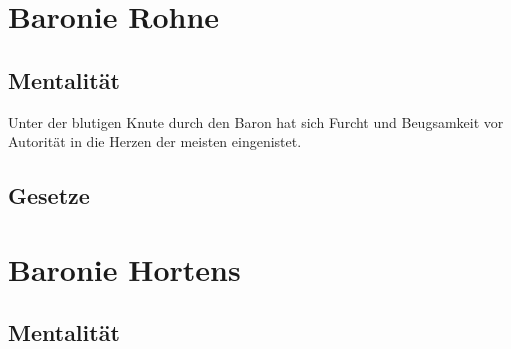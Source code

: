\documentclass[a4paper,12pt,oneside]{book}
\begin{document}
\section{Baronie Rohne}
\subsection{Mentalität}
Unter der blutigen Knute durch den Baron hat sich Furcht und Beugsamkeit vor Autorität in die Herzen der meisten eingenistet.  
\subsection{Gesetze}
 
\section{Baronie Hortens}
\subsection{Mentalität}
\end{document}
